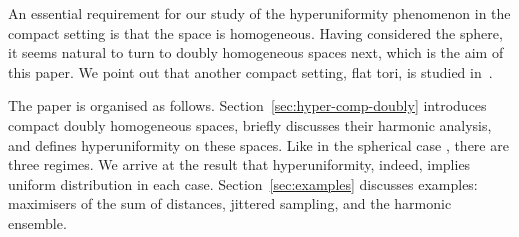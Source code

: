 An essential requirement for our study of the hyperuniformity phenomenon in the compact setting is that the space is homogeneous. Having considered the sphere, it seems natural to turn to doubly homogeneous spaces next, which is the aim of this paper. We point out that another compact setting,  flat tori, is studied in~\cite{Stepanyuk2020:hyperuniform_point_sets}. 


The paper is organised as follows. Section~\ref{sec:hyper-comp-doubly} introduces compact doubly homogeneous spaces, briefly discusses their harmonic analysis, and defines hyperuniformity on these spaces. Like in the spherical case \cite{Brauchart_Grabner_Kusner+2020:hyperuniform_point_sets, Brauchart_Grabner_Kusner2019:hyperuniform_deterministic}, there are three regimes. We arrive at the result that hyperuniformity, indeed, implies uniform distribution in each case. 
%
Section~\ref{sec:examples} discusses examples: maximisers of the sum of distances, jittered sampling, and the harmonic ensemble. 





